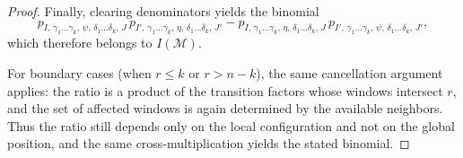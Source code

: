 \documentclass[10pt,a4paper]{amsart}
\begin{document}
\begin{proof}
Finally, clearing denominators yields the binomial
\[
p_{I,\,\gamma_1\ldots\gamma_k,\,\psi,\,\delta_1\ldots\delta_k,\,J}\,
p_{I',\,\gamma_1\ldots\gamma_k,\,\eta,\,\delta_1\ldots\delta_k,\,J'}
-p_{I,\,\gamma_1\ldots\gamma_k,\,\eta,\,\delta_1\ldots\delta_k,\,J}\,
p_{I',\,\gamma_1\ldots\gamma_k,\,\psi,\,\delta_1\ldots\delta_k,\,J'},
\]
which therefore belongs to $I(\mathcal{M})$.

For boundary cases (when $r\le k$ or $r>n-k$), the same cancellation argument applies:
the ratio is a product of the transition factors whose windows intersect $r$, and the set of
affected windows is again determined by the available neighbors.
Thus the ratio still depends only on the local configuration and not on the global position,
and the same cross-multiplication yields the stated binomial.
\end{proof}
\end{document}
